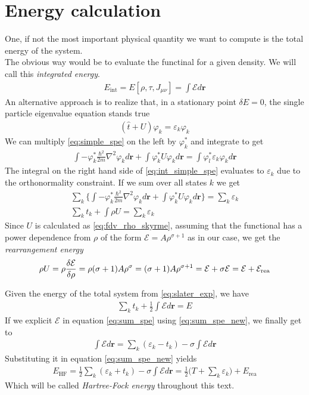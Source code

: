 \section{Energy calculation}
One, if not the most important physical quantity we want to compute is the total energy of the system.
\\The obvious way would be to evaluate the functinal for a given density. We will call this \textit{integrated energy}.
\begin{align}
    E_\text{int} = E[\rho, \tau, J_{\mu\nu}]= \int \mathcal E d\mathbf r
\end{align}
An alternative approach is to realize that, in a stationary point $\delta E = 0$, the single particle eigenvalue equation stands true
\begin{align}
    \label{eq:simple_spe}
    (\hat t + U)\varphi_k = \varepsilon_k \varphi_k
\end{align}
We can multiply \ref{eq:simple_spe} on the left by $\varphi_k^*$ and integrate to get
\begin{align}
    \label{eq:int_simple_spe}
    \int -\varphi_k^* \frac{\hbar^2}{2m}\nabla^2\varphi_k d\bm r + \int \varphi_k^* U \varphi_k d\bm r = \int \varphi_l^* \varepsilon_k \varphi_k d\bm r
\end{align}
The integral on the right hand side of \ref{eq:int_simple_spe} evaluates to $\varepsilon_k$ due to the orthonormality constraint. If we sum over all states $k$ we get
\begin{align}
    \sum_k \bigg\{\int -\varphi_k^* \frac{\hbar^2}{2m}\nabla^2\varphi_k d\bm r + \int \varphi_k^* U \varphi_k d\bm r \bigg\}= \sum_k \varepsilon_k 
    \\\sum_k t_k + \int \rho U = \sum_k \varepsilon_k \label{eq:sum_spe}
\end{align}
Since $U$ is calculated as \ref{eq:fdv_rho_skyrme}, assuming that the functional has a power dependence from $\rho$ of the form $\mathcal E = A\rho^{\sigma+1}$ as in our case, we get the \textit{rearrangement energy}
\begin{align}
    \label{eq:sum_spe_new}
    \rho U = \rho \fdv{\mathcal E}{\rho} = \rho(\sigma +1)A \rho^\sigma = (\sigma+1)A \rho^{\sigma+1} = \mathcal E + \sigma \mathcal E = \mathcal E + \mathcal E_\text{rea}
\end{align}

Given the energy of the total system from \ref{eq:slater_exp}, we have
\begin{align}
\sum_k t_k + \frac 1 2 \int \mathcal E d\bm r = E
\end{align}
If we explicit $\mathcal E$ in equation \ref{eq:sum_spe} using \ref{eq:sum_spe_new}, we finally get to
\begin{align}
    \int \mathcal Ed\bm r = \sum_k (\varepsilon_k -t_k) - \sigma\int \mathcal Ed\bm r
\end{align}
Substituting it in equation \ref{eq:sum_spe_new} yields
\begin{align}
    \label{eq:hf_energy}
E_\text{HF} = \frac 1 2 \sum_k (\varepsilon_k + t_k) - \sigma \int \mathcal E d\bm r = \frac 1 2 \bigg(T+\sum_k\varepsilon_k\bigg) +E_\text{rea}
\end{align}
Which will be called \textit{Hartree-Fock energy} throughout this text.

